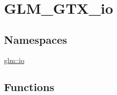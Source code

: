 \hypertarget{group__gtx__io}{}\section{G\+L\+M\+\_\+\+G\+T\+X\+\_\+io}
\label{group__gtx__io}
\subsection*{Namespaces}
\begin{DoxyCompactItemize}
\item 
 \hyperlink{namespaceglm_1_1io}{glm\+::io}
\end{DoxyCompactItemize}
\subsection*{Functions}
